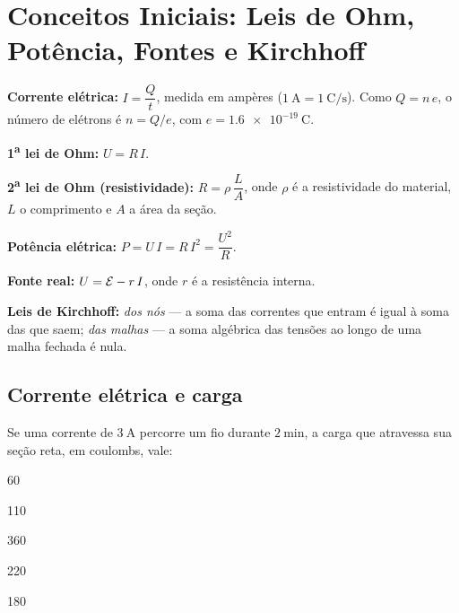 \section{Conceitos Iniciais: Leis de Ohm, Potência, Fontes e Kirchhoff}

\begin{conceito}
\textbf{Corrente elétrica:} $I = \dfrac{Q}{t}$, medida em ampères
($\SI{1}{\ampere}=\SI{1}{\coulomb\per\second}$). Como $Q = n\,e$, o número de
elétrons é $n = Q/e$, com $e=\SI{1.6e-19}{\coulomb}$.\par
\textbf{1\textsuperscript{a} lei de Ohm:} $U = R\,I$.\par
\textbf{2\textsuperscript{a} lei de Ohm (resistividade):}
$R = \rho\,\dfrac{L}{A}$, onde $\rho$ é a resistividade do material, $L$ o
comprimento e $A$ a área da seção.\par
\textbf{Potência elétrica:}
$P = U\,I = R\,I^2 = \dfrac{U^2}{R}$.\par
\textbf{Fonte real:} $U = \mathcal{E} - r\,I$, onde $r$ é a resistência interna.\par
\textbf{Leis de Kirchhoff:} \emph{dos nós} --- a soma das correntes que entram é
igual à soma das que saem; \emph{das malhas} --- a soma algébrica das tensões ao
longo de uma malha fechada é nula.
\end{conceito}

\legendaniveis

\subsection{Corrente elétrica e carga}

\blocofixacao

\begin{questao}[1]{}
Se uma corrente de $\SI{3}{\ampere}$ percorre um fio durante $\SI{2}{\minute}$, a
carga que atravessa sua seção reta, em coulombs, vale:
\begin{alternativas}[3]
\item 60
\item 110
\item 360
\item 220
\item 180
\end{alternativas}
\end{questao}

